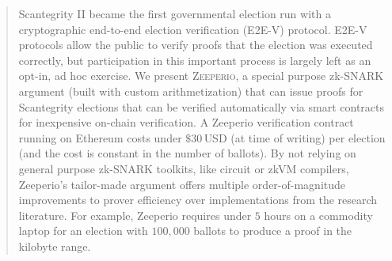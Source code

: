 \begin{abstract}

Scantegrity II became the first governmental election run with a cryptographic end-to-end election verification (E2E-V) protocol.
E2E-V protocols allow the public to verify proofs that the election was executed correctly, but participation in this important process is largely left as an opt-in, ad hoc exercise.
We present \textsc{Zeeperio}, a special purpose zk-SNARK argument (built with custom arithmetization) that can issue proofs for Scantegrity elections that can be verified automatically via smart contracts for inexpensive on-chain verification.
A Zeeperio verification contract running on Ethereum costs under $\$30\,$USD (at time of writing) per election (and the cost is constant in the number of ballots).
By not relying on general purpose zk-SNARK toolkits, like circuit or zkVM compilers, Zeeperio's tailor-made argument offers multiple order-of-magnitude improvements to prover efficiency over implementations from the research literature. For example, Zeeperio requires under $5$ hours on a commodity laptop for an election with $100{,}000$ ballots to produce a proof in the kilobyte range.

\end{abstract}
